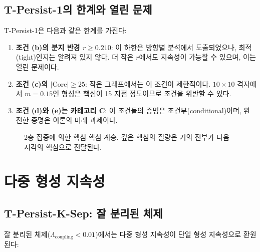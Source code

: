 \subsection{T-Persist-1의 한계와 열린 문제}

T-Persist-1은 다음과 같은 한계를 가진다:

\begin{enumerate}
    \item \textbf{조건 (b)의 분지 반경 $r \geq 0.210$}: 이 하한은 방향별 분석에서 도출되었으나, 최적(tight)인지는 알려져 있지 않다. 더 작은 $r$에서도 지속성이 가능할 수 있으며, 이는 열린 문제이다.
    \item \textbf{조건 (c)의 $|\mathrm{Core}| \geq 25$}: 작은 그래프에서는 이 조건이 제한적이다. $10 \times 10$ 격자에서 $m = 0.15$인 형성은 핵심이 15 지점 정도이므로 조건을 위반할 수 있다.
    \item \textbf{조건 (d)와 (e)는 카테고리 C}: 이 조건들의 증명은 조건부(conditional)이며, 완전한 증명은 이론의 미래 과제이다.
\end{enumerate}

\begin{figure}[t]
\centering
{}
\caption{2층 집중에 의한 핵심-핵심 계승. 깊은 핵심의 질량은 거의 전부가 다음 시각의 핵심으로 전달된다.}
\label{fig:core-to-core}
\end{figure}


\section{다중 형성 지속성}
\label{sec:multi-persist}

\subsection{T-Persist-K-Sep: 잘 분리된 체제}

잘 분리된 체제($\Lambda_{\mathrm{coupling}} < 0.01$)에서는 다중 형성 지속성이 단일 형성 지속성으로 환원된다:

